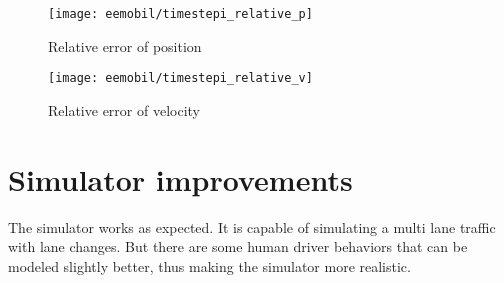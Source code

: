 		\begin{figure}
			\centering
			\begin{minipage}{.5\textwidth}
				\centering
				\texttt{[image: eemobil/timestepi\_relative\_p]}
				\caption{Relative error of position}
				\label{fig:tsipr}
			\end{minipage}\hfill
			\begin{minipage}{.5\textwidth}
				\centering
				\texttt{[image: eemobil/timestepi\_relative\_v]}
				\caption{Relative error of velocity}
				\label{fig:tsivr}
			\end{minipage}
		\end{figure}
		\section{Simulator improvements}
		The simulator works as expected. It is capable of simulating a multi lane traffic with lane changes. But there are some human driver behaviors that can be modeled slightly better, thus making the simulator more realistic.
